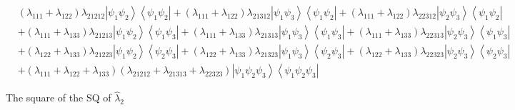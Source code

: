 \documentclass[aps,preprint]{revtex4}%
\begin{document}
\begin{align}
& \left(  \lambda_{111}+\lambda_{122}\right)  \lambda_{21212}\left\vert
\psi_{1}\psi_{2}\right\rangle \left\langle \psi_{1}\psi_{2}\right\vert
+\left(  \lambda_{111}+\lambda_{122}\right)  \lambda_{21312}\left\vert
\psi_{1}\psi_{3}\right\rangle \left\langle \psi_{1}\psi_{2}\right\vert
+\left(  \lambda_{111}+\lambda_{122}\right)  \lambda_{22312}\left\vert
\psi_{2}\psi_{3}\right\rangle \left\langle \psi_{1}\psi_{2}\right\vert
\nonumber\\
& +\left(  \lambda_{111}+\lambda_{133}\right)  \lambda_{21213}\left\vert
\psi_{1}\psi_{2}\right\rangle \left\langle \psi_{1}\psi_{3}\right\vert
+\left(  \lambda_{111}+\lambda_{133}\right)  \lambda_{21313}\left\vert
\psi_{1}\psi_{3}\right\rangle \left\langle \psi_{1}\psi_{3}\right\vert
+\left(  \lambda_{111}+\lambda_{133}\right)  \lambda_{22313}\left\vert
\psi_{2}\psi_{3}\right\rangle \left\langle \psi_{1}\psi_{3}\right\vert
\nonumber\\
& +\left(  \lambda_{122}+\lambda_{133}\right)  \lambda_{21223}\left\vert
\psi_{1}\psi_{2}\right\rangle \left\langle \psi_{2}\psi_{3}\right\vert
+\left(  \lambda_{122}+\lambda_{133}\right)  \lambda_{21323}\left\vert
\psi_{1}\psi_{3}\right\rangle \left\langle \psi_{2}\psi_{3}\right\vert
+\left(  \lambda_{122}+\lambda_{133}\right)  \lambda_{22323}\left\vert
\psi_{2}\psi_{3}\right\rangle \left\langle \psi_{2}\psi_{3}\right\vert
\nonumber\\
& +\left(  \lambda_{111}+\lambda_{122}+\lambda_{133}\right)  \left(
\lambda_{21212}+\lambda_{21313}+\lambda_{22323}\right)  \left\vert \psi
_{1}\psi_{2}\psi_{3}\right\rangle \left\langle \psi_{1}\psi_{2}\psi
_{3}\right\vert
\end{align}


\bigskip

The square of the SQ of $\hat{\lambda}_{2}$ %
\end{document}
